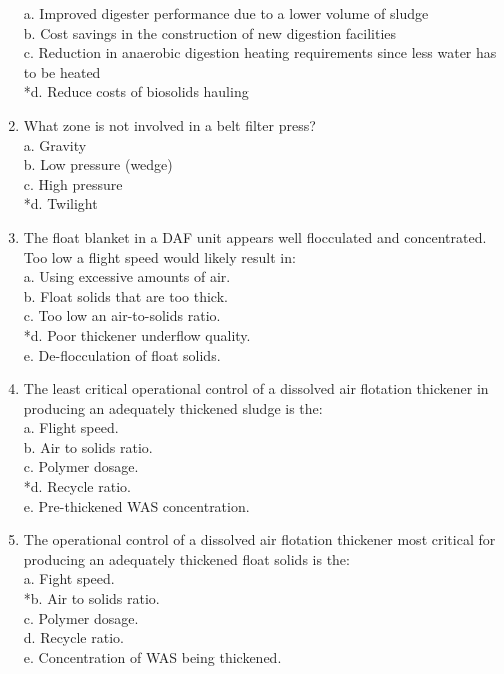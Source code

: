 \begin{enumerate}
a. Improved digester performance due to a lower volume of sludge \\
b. Cost savings in the construction of new digestion facilities \\
c. Reduction in anaerobic digestion heating requirements since less water has to be heated \\
*d. Reduce costs of biosolids hauling \\

\item  What zone is not involved in a belt filter press? \\

a. Gravity \\
b. Low pressure (wedge) \\
c. High pressure \\
*d. Twilight \\

\item  The float blanket in a DAF unit appears well flocculated and concentrated.  Too low a flight speed would likely result in: \\

a. Using excessive amounts of air. \\
b. Float solids that are too thick. \\
c. Too low an air-to-solids ratio. \\
*d. Poor thickener underflow quality. \\
e. De-flocculation of float solids. \\

\item  The least critical operational control of a dissolved air flotation thickener in producing an adequately thickened sludge is the: \\

a. Flight speed. \\
b. Air to solids ratio. \\
c. Polymer dosage. \\
*d. Recycle ratio. \\
e. Pre-thickened WAS concentration. \\

\item  The operational control of a dissolved air flotation thickener most critical for producing an adequately thickened float solids is the: \\

a. Fight speed. \\
*b. Air to solids ratio. \\
c. Polymer dosage. \\
d. Recycle ratio. \\
e. Concentration of WAS being thickened. \\


\end{enumerate}
